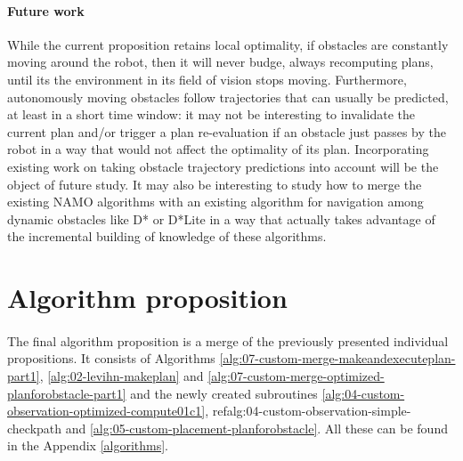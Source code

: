 \paragraph{Future work} While the current proposition retains local optimality, if obstacles are constantly moving around the robot, then it will never budge, always recomputing plans, until its the environment in its field of vision stops moving. Furthermore, autonomously moving obstacles follow trajectories that can usually be predicted, at least in a short time window: it may not be interesting to invalidate the current plan and/or trigger a plan re-evaluation if an obstacle just passes by the robot in a way that would not affect the optimality of its plan. Incorporating existing work on taking obstacle trajectory predictions into account will be the object of future study. It may also be interesting to study how to merge the existing NAMO algorithms with an existing algorithm for navigation among dynamic obstacles like D* or D*Lite in a way that actually takes advantage of the incremental building of knowledge of these algorithms.

\section{Algorithm proposition}\label{merged_proposition_section}

\paragraph{} The final algorithm proposition is a merge of the previously presented individual propositions. It consists of Algorithms \ref{alg:07-custom-merge-makeandexecuteplan-part1}, \ref{alg:02-levihn-makeplan} and \ref{alg:07-custom-merge-optimized-planforobstacle-part1} and the newly created subroutines \ref{alg:04-custom-observation-optimized-compute01c1}, ref{alg:04-custom-observation-simple-checkpath} and \ref{alg:05-custom-placement-planforobstacle}. All these can be found in the Appendix \ref{algorithms}.
